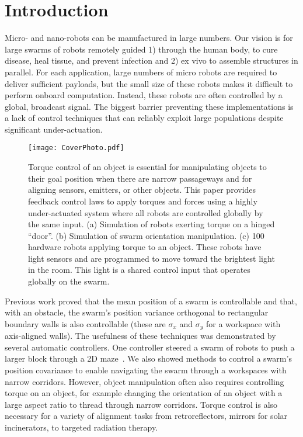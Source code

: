 \section{Introduction}\label{sec:Intro}
Micro- and nano-robots can be manufactured in large numbers.
Our vision is for large swarms of robots remotely guided 1) through the human body, to cure disease, heal tissue, and prevent infection and 2) ex vivo to assemble structures in parallel. 
 For each application, large numbers of micro robots are required  to deliver sufficient payloads, but the small size of these robots makes it difficult to perform onboard computation.  Instead, these robots are often controlled by a global, broadcast signal. 
 The biggest barrier preventing these implementations is a lack of control techniques that can reliably exploit large populations despite significant under-actuation.  
 

\begin{figure}
\begin{center}
	\texttt{[image: CoverPhoto.pdf]}
\end{center}
\vspace{-1em}
\caption{\label{fig:FirstImage}
Torque control of an object is essential for manipulating objects to their goal position  when there are narrow passageways and for aligning sensors, emitters, or other objects. 
This paper provides feedback control laws to apply torques and forces using a highly under-actuated system where all 
robots are controlled globally by the same input. 
(a) Simulation of robots exerting torque on a hinged ``door''.
(b) Simulation of swarm orientation manipulation.
(c) 100 hardware robots applying torque to an object. These robots have light sensors and are programmed to move toward the brightest light in the room.  This light is a shared control input that operates globally on the swarm.
}
\vspace{-1em}
\end{figure}


Previous work proved that the mean position of a swarm is controllable and that, with an obstacle, the swarm's position variance orthogonal to rectangular boundary walls  is also controllable
(these are $\sigma_x$ and $\sigma_y$ for a workspace with axis-aligned walls). 
The usefulness of these techniques was demonstrated by several automatic controllers. One controller steered a swarm of robots to push a larger block through a 2D maze~\cite{ShahrokhiIROS2015}. 
We also showed methods to control a swarm's position covariance to enable navigating the swarm through a workspaces with narrow corridors.  
However, object manipulation often also requires controlling torque on an object, for example changing the orientation of an object with a large aspect ratio to thread through narrow corridors.
Torque control  is also necessary for a variety of alignment tasks from retroreflectors, mirrors for solar incinerators, to targeted radiation therapy.

